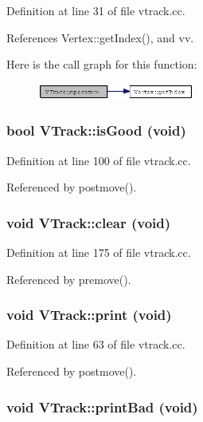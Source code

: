 Definition at line 31 of file vtrack.cc.

References Vertex::get\-Index(), and vv.

Here is the call graph for this function:\begin{figure}[H]
\begin{center}
\leavevmode
\includegraphics[width=146pt]{classVTrack_9b0cc4eb615943338033f9d07fd52e48_cgraph}
\end{center}
\end{figure}
\subsubsection{\setlength{\rightskip}{0pt plus 5cm}bool VTrack::is\-Good (void)}\label{classVTrack_ca6c7a71f823e2e65861a6a0b77953d5}




Definition at line 100 of file vtrack.cc.

Referenced by postmove().
\subsubsection{\setlength{\rightskip}{0pt plus 5cm}void VTrack::clear (void)}\label{classVTrack_d1d0f87e5c865a9a61648ff184338460}




Definition at line 175 of file vtrack.cc.

Referenced by premove().
\subsubsection{\setlength{\rightskip}{0pt plus 5cm}void VTrack::print (void)}\label{classVTrack_17a4d3fb66d3641a39b519cfe9a51986}




Definition at line 63 of file vtrack.cc.

Referenced by postmove().
\subsubsection{\setlength{\rightskip}{0pt plus 5cm}void VTrack::print\-Bad (void)}\label{classVTrack_d17ae565fa54b47aabf0ba8122f7cac8}




